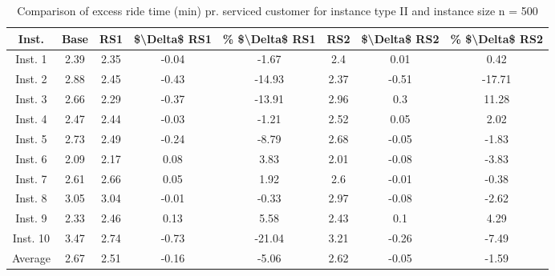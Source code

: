 \begin{table}[H]
\centering
\begin{tabular}{cccccccc}
  \hline
  \textbf{Inst.} & \textbf{Base} & \textbf{RS1} & \textbf{\$\textbackslash{}Delta\$  RS1} & \textbf{\% \$\textbackslash{}Delta\$  RS1} & \textbf{RS2} & \textbf{\$\textbackslash{}Delta\$  RS2} & \textbf{\% \$\textbackslash{}Delta\$  RS2} \\\hline
  Inst. 1 & 2.39 & 2.35 & -0.04 & -1.67 & 2.4 & 0.01 & 0.42 \\
  Inst. 2 & 2.88 & 2.45 & -0.43 & -14.93 & 2.37 & -0.51 & -17.71 \\
  Inst. 3 & 2.66 & 2.29 & -0.37 & -13.91 & 2.96 & 0.3 & 11.28 \\
  Inst. 4 & 2.47 & 2.44 & -0.03 & -1.21 & 2.52 & 0.05 & 2.02 \\
  Inst. 5 & 2.73 & 2.49 & -0.24 & -8.79 & 2.68 & -0.05 & -1.83 \\
  Inst. 6 & 2.09 & 2.17 & 0.08 & 3.83 & 2.01 & -0.08 & -3.83 \\
  Inst. 7 & 2.61 & 2.66 & 0.05 & 1.92 & 2.6 & -0.01 & -0.38 \\
  Inst. 8 & 3.05 & 3.04 & -0.01 & -0.33 & 2.97 & -0.08 & -2.62 \\
  Inst. 9 & 2.33 & 2.46 & 0.13 & 5.58 & 2.43 & 0.1 & 4.29 \\
  Inst. 10 & 3.47 & 2.74 & -0.73 & -21.04 & 3.21 & -0.26 & -7.49 \\
  Average & 2.67 & 2.51 & -0.16 & -5.06 & 2.62 & -0.05 & -1.59 \\\hline
\end{tabular}
\caption{Comparison of excess ride time (min) pr. serviced customer for instance type II and instance size n = 500}
\label{tab:wait:resrelocation-excess-ride-time-comparison_II_500}
\end{table}
